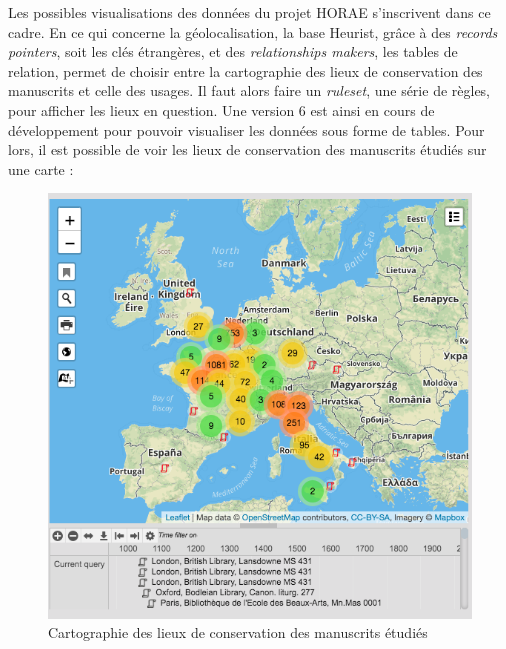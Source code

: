 \documentclass[a4paper,12pt,twoside]{book}
\begin{document}
Les possibles visualisations des données du projet HORAE s'inscrivent dans ce cadre. En ce qui concerne la géolocalisation, la base Heurist, grâce à des \textit{records pointers}, soit les clés étrangères, et des \textit{relationships makers}, les tables de relation, permet de choisir entre la cartographie des lieux de conservation des manuscrits et celle des usages. Il faut alors faire un \textit{ruleset}, une série de règles, pour afficher les lieux en question. Une version 6 est ainsi en cours de développement pour pouvoir visualiser les données sous forme de tables. Pour lors, il est possible de voir les lieux de conservation des manuscrits étudiés sur une carte : 
    \newpage
    \begin{figure}[!h]
    \centering
    \includegraphics[width=15cm]{img/DataViz/Conservation_manuscrits.png}
    \caption{Cartographie des lieux de conservation des manuscrits étudiés}
    \end{figure}
    \clearpage
\end{document}
